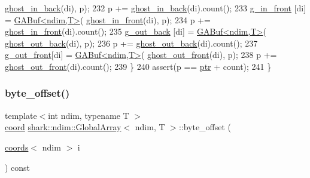\begin{DoxyCode}
      \hyperlink{classshark_1_1ndim_1_1_global_array_a55074d9d00de584f5817668e0c69f58a}{ghost\_in\_back}(di), p); 
232                 p += \hyperlink{classshark_1_1ndim_1_1_global_array_a55074d9d00de584f5817668e0c69f58a}{ghost\_in\_back}(di).count();
233                 \hyperlink{classshark_1_1ndim_1_1_global_array_a2f3fe48d925bc0c3a489b83203eaddfe}{g\_in\_front} [di] = \hyperlink{classshark_1_1ndim_1_1_g_a_buf}{GABuf<ndim,T>}(
      \hyperlink{classshark_1_1ndim_1_1_global_array_a8432959070aee7062f09cae8e7f20097}{ghost\_in\_front}(di), p);
234                 p += \hyperlink{classshark_1_1ndim_1_1_global_array_a8432959070aee7062f09cae8e7f20097}{ghost\_in\_front}(di).count();
235                 \hyperlink{classshark_1_1ndim_1_1_global_array_a1f7c189d498d7e7c1c79d9a613d1c5a9}{g\_out\_back} [di] = \hyperlink{classshark_1_1ndim_1_1_g_a_buf}{GABuf<ndim,T>}(
      \hyperlink{classshark_1_1ndim_1_1_global_array_ae4618013580af820c76c7e48d6de874a}{ghost\_out\_back}(di), p);
236                 p += \hyperlink{classshark_1_1ndim_1_1_global_array_ae4618013580af820c76c7e48d6de874a}{ghost\_out\_back}(di).count();
237                 \hyperlink{classshark_1_1ndim_1_1_global_array_ad811cd36846992d5671148e7da49bb04}{g\_out\_front}[di] = \hyperlink{classshark_1_1ndim_1_1_g_a_buf}{GABuf<ndim,T>}(
      \hyperlink{classshark_1_1ndim_1_1_global_array_ad004cd3a0deeaee55d7f3590063d5a20}{ghost\_out\_front}(di), p);
238                 p += \hyperlink{classshark_1_1ndim_1_1_global_array_ad004cd3a0deeaee55d7f3590063d5a20}{ghost\_out\_front}(di).count();
239         \}
240         assert(p == \hyperlink{classshark_1_1ndim_1_1_global_array_ad4af3b8307a3a7107186cf699b5a2432}{ptr} + count);
241 \}
\end{DoxyCode}
\hypertarget{classshark_1_1ndim_1_1_global_array_afc41f124baff4e53c97c38c8cbd82398}{}\label{classshark_1_1ndim_1_1_global_array_afc41f124baff4e53c97c38c8cbd82398} 
\subsubsection{\texorpdfstring{byte\+\_\+offset()}{byte\_offset()}}
{\footnotesize\ttfamily template$<$int ndim, typename T $>$ \\
\hyperlink{namespaceshark_a767a92d5dd82cb82266473bff42fa6d9}{coord} \hyperlink{classshark_1_1ndim_1_1_global_array}{shark\+::ndim\+::\+Global\+Array}$<$ ndim, T $>$\+::byte\+\_\+offset (\begin{DoxyParamCaption}\item[{\hyperlink{structshark_1_1ndim_1_1coords}{coords}$<$ ndim $>$}]{i }\end{DoxyParamCaption}) const\hspace{0.3cm}{\ttfamily [inline]}}



